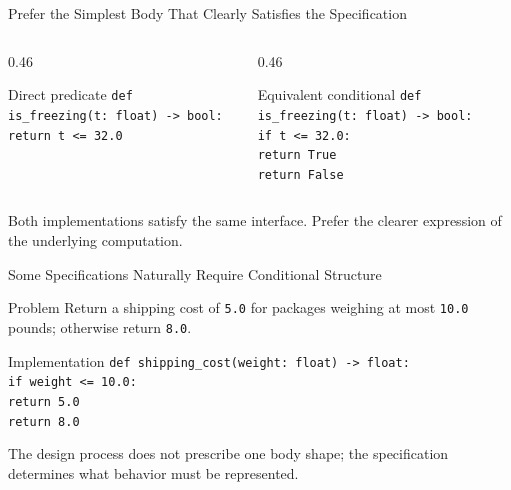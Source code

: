 \documentclass[aspectratio=169,10pt]{beamer}
\begin{document}
\begin{frame}{Prefer the Simplest Body That Clearly Satisfies the Specification}
  \begin{columns}[T,onlytextwidth]
    \begin{column}{0.46\textwidth}
      \begin{block}{Direct predicate}
        \texttt{def is\_freezing(t: float) -> bool:}\\
        \hspace*{0.20in}\texttt{return t <= 32.0}
      \end{block}
    \end{column}
    \begin{column}{0.46\textwidth}
      \begin{block}{Equivalent conditional}
        \texttt{def is\_freezing(t: float) -> bool:}\\
        \hspace*{0.20in}\texttt{if t <= 32.0:}\\
        \hspace*{0.40in}\texttt{return True}\\
        \hspace*{0.20in}\texttt{return False}
      \end{block}
    \end{column}
  \end{columns}

  \begin{keyidea}
    Both implementations satisfy the same interface. Prefer the clearer expression of the underlying computation.
  \end{keyidea}
\end{frame}

\begin{frame}{Some Specifications Naturally Require Conditional Structure}
  \begin{block}{Problem}
    Return a shipping cost of \texttt{5.0} for packages weighing at most \texttt{10.0} pounds; otherwise return \texttt{8.0}.
  \end{block}

  \begin{block}{Implementation}
    \texttt{def shipping\_cost(weight: float) -> float:}\\
    \hspace*{0.20in}\texttt{if weight <= 10.0:}\\
    \hspace*{0.40in}\texttt{return 5.0}\\
    \hspace*{0.20in}\texttt{return 8.0}
  \end{block}

  \begin{keyidea}
    The design process does not prescribe one body shape; the specification determines what behavior must be represented.
  \end{keyidea}
\end{frame}
\end{document}
